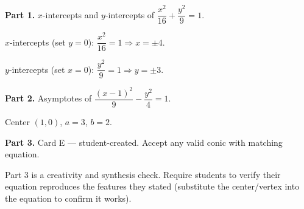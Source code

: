 \documentclass[10pt]{article}
\begin{document}
\begin{tcolorbox}[colback=white, colframe=black!40,
    title=\textbf{Tier E --- Extension},
    fonttitle=\bfseries, arc=2mm, left=3mm, right=3mm, top=2mm, bottom=2mm]

\textbf{Part 1.} $x$-intercepts and $y$-intercepts of $\dfrac{x^2}{16} + \dfrac{y^2}{9} = 1$.

$x$-intercepts (set $y = 0$): $\dfrac{x^2}{16} = 1 \Rightarrow x = \pm 4$.

$y$-intercepts (set $x = 0$): $\dfrac{y^2}{9} = 1 \Rightarrow y = \pm 3$.

\vspace{8pt}
\textbf{Part 2.} Asymptotes of $\dfrac{(x-1)^2}{9} - \dfrac{y^2}{4} = 1$.

Center $(1, 0)$, $a = 3$, $b = 2$.

\vspace{8pt}
\textbf{Part 3.} Card E --- student-created. Accept any valid conic with matching equation.


\end{tcolorbox}

\begin{teachernote}
Part 3 is a creativity and synthesis check. Require students to verify their equation
reproduces the features they stated (substitute the center/vertex into the equation to
confirm it works).
\end{teachernote}
\end{document}
